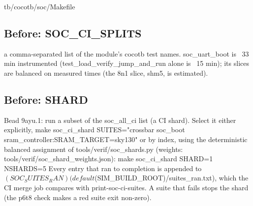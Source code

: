 \begin{relocated}{tb/cocotb/soc/Makefile}

\subsection*{Before: SOC\_CI\_SPLITS}

\begin{textblock}
a comma-separated list of the module's cocotb test names.  soc_uart_boot is ~33 min instrumented
(test_load_verify_jump_and_run alone is ~15 min); its slices are balanced on measured times (the 8n1 slice, shm5, is estimated).
\end{textblock}

\subsection*{Before: SHARD}

\begin{textblock}
Bead 9ayu.1: run a subset of the soc_all_ci list (a CI shard).  Select it either explicitly,
  make soc_ci_shard SUITES="crossbar soc_boot sram_controller:SRAM_TARGET=sky130"
or by index, using the deterministic balanced assignment of tools/verif/soc_shards.py
(weights: tools/verif/soc_shard_weights.json):
  make soc_ci_shard SHARD=1 NSHARDS=5
Every entry that ran to completion is appended to $(SOC_SUITES_RAN) (default
$(SIM_BUILD_ROOT)/suites_ran.txt), which the CI merge job compares with print-soc-ci-suites.
A suite that fails stops the shard (the p6t8 check makes a red suite exit non-zero).
\end{textblock}


\end{relocated}
